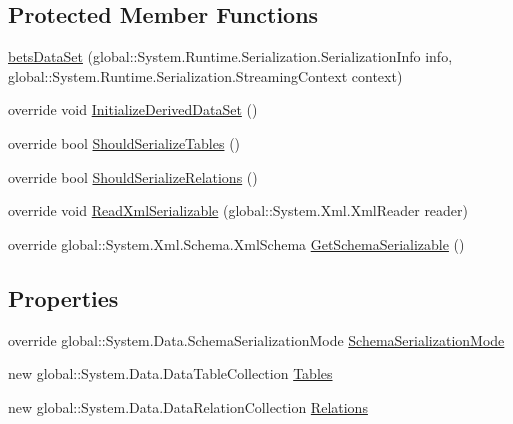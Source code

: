 \subsection*{Protected Member Functions}
\begin{DoxyCompactItemize}
\item 
\mbox{\hyperlink{class_bets4_you_1_1bets_data_set_ad21b63679b828f26228e5bc340cbe5fa}{bets\+Data\+Set}} (global\+::\+System.\+Runtime.\+Serialization.\+Serialization\+Info info, global\+::\+System.\+Runtime.\+Serialization.\+Streaming\+Context context)
\item 
override void \mbox{\hyperlink{class_bets4_you_1_1bets_data_set_aa0fbe7550524a87702b401e033e2aba1}{Initialize\+Derived\+Data\+Set}} ()
\item 
override bool \mbox{\hyperlink{class_bets4_you_1_1bets_data_set_ac92842294f0f7c01021106c9daa47d0c}{Should\+Serialize\+Tables}} ()
\item 
override bool \mbox{\hyperlink{class_bets4_you_1_1bets_data_set_a5f39b1f875e5c64fb03cff7328ae4c84}{Should\+Serialize\+Relations}} ()
\item 
override void \mbox{\hyperlink{class_bets4_you_1_1bets_data_set_a17b67f0466fbf24ea4c3e5eec1c2c077}{Read\+Xml\+Serializable}} (global\+::\+System.\+Xml.\+Xml\+Reader reader)
\item 
override global\+::\+System.\+Xml.\+Schema.\+Xml\+Schema \mbox{\hyperlink{class_bets4_you_1_1bets_data_set_a7711e3b70244060e65eafd97533353c4}{Get\+Schema\+Serializable}} ()
\end{DoxyCompactItemize}
\subsection*{Properties}
\begin{DoxyCompactItemize}
\item 
override global\+::\+System.\+Data.\+Schema\+Serialization\+Mode \mbox{\hyperlink{class_bets4_you_1_1bets_data_set_ad7c4bcb777e168bfe49a2ce4ab164f8b}{Schema\+Serialization\+Mode}}
\item 
new global\+::\+System.\+Data.\+Data\+Table\+Collection \mbox{\hyperlink{class_bets4_you_1_1bets_data_set_a84665f17591ef8d70a383f9a2576ae77}{Tables}}
\item 
new global\+::\+System.\+Data.\+Data\+Relation\+Collection \mbox{\hyperlink{class_bets4_you_1_1bets_data_set_abc8988a6db137e68a34dee38ccde4d6c}{Relations}}
\end{DoxyCompactItemize}


